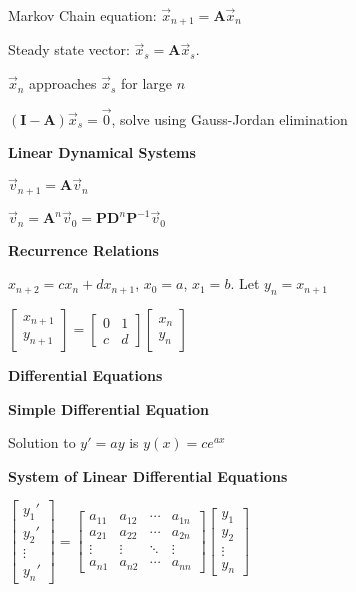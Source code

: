 \documentclass[10pt]{article}
\newcommand{\matr}[1]{\mathbf{#1}}
\newcommand{\inv}{^{-1}}
\newcommand\sectionheading[1]{\begin{center}\large{\textbf{#1}}\end{center}\normalsize}
\newcommand\heading[1]{\medskip\textbf{#1}\medskip}
\begin{document}
\begin{multicols*}{3}
Markov Chain equation: $\vec x_{n+1}=\matr{A}\vec x_n$

Steady state vector: $\vec x_s=\matr{A}\vec x_s$. 

$\vec x_n$ approaches $\vec x_s$ for large $n$

$(\matr{I}-\matr{A})\vec x_s=\vec 0$, solve using Gauss-Jordan elimination 

\heading{Linear Dynamical Systems}

$\vec v_{n+1}=\matr{A}\vec v_n$

$\vec v_n=\matr{A}^n\vec v_0=\matr{P}\matr{D}^n\matr{P}\inv\vec v_0$

\heading{Recurrence Relations}

$x_{n+2}=cx_n+dx_{n+1}$, $x_0=a$, $x_1=b$. Let $y_n=x_{n+1}$

$\begin{bmatrix}
    x_{n+1} \\
    y_{n+1}
\end{bmatrix} = \begin{bmatrix}
    0 & 1 \\
    c & d
\end{bmatrix} \begin{bmatrix}
    x_n \\
    y_n
\end{bmatrix}$

\sectionheading{Differential Equations}

\heading{Simple Differential Equation}

Solution to $y'=ay$ is $y(x)=ce^{ax}$

\heading{System of Linear Differential Equations}

$\begin{bmatrix}
    y_1' \\
    y_2' \\
    \vdots \\
    y_n'
\end{bmatrix}=\begin{bmatrix}
    a_{11} & a_{12} & \cdots & a_{1n} \\
    a_{21} & a_{22} & \cdots & a_{2n} \\
    \vdots & \vdots & \ddots & \vdots \\
    a_{n1} & a_{n2} & \cdots & a_{nn}
\end{bmatrix}\begin{bmatrix}
    y_1 \\
    y_2 \\
    \vdots \\
    y_n
\end{bmatrix}$


\end{multicols*}
\end{document}
